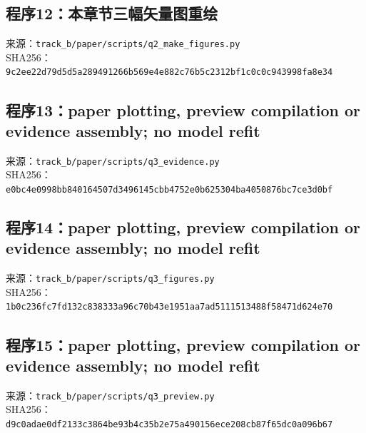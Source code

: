 \subsection*{程序12：本章节三幅矢量图重绘}
\noindent 来源：\nolinkurl{track_b/paper/scripts/q2_make_figures.py}\\
\noindent SHA256：\texttt{9c2ee22d79d5d5a289491266b569e4e8}\allowbreak\texttt{82c76b5c2312bf1c0c0c943998fa8e34}\\
\clearpage
\subsection*{程序13：paper plotting, preview compilation or evidence assembly; no model refit}
\noindent 来源：\nolinkurl{track_b/paper/scripts/q3_evidence.py}\\
\noindent SHA256：\texttt{e0bc4e0998bb840164507d3496145cbb}\allowbreak\texttt{4752e0b625304ba4050876bc7ce3d0bf}\\
\clearpage
\subsection*{程序14：paper plotting, preview compilation or evidence assembly; no model refit}
\noindent 来源：\nolinkurl{track_b/paper/scripts/q3_figures.py}\\
\noindent SHA256：\texttt{1b0c236fc7fd132c838333a96c70b43e}\allowbreak\texttt{1951aa7ad5111513488f58471d624e70}\\
\clearpage
\subsection*{程序15：paper plotting, preview compilation or evidence assembly; no model refit}
\noindent 来源：\nolinkurl{track_b/paper/scripts/q3_preview.py}\\
\noindent SHA256：\texttt{d9c0adae0df2133c3864be93b4c35b2e}\allowbreak\texttt{75a490156ece208cb87f65dc0a096b67}\\
\clearpage
